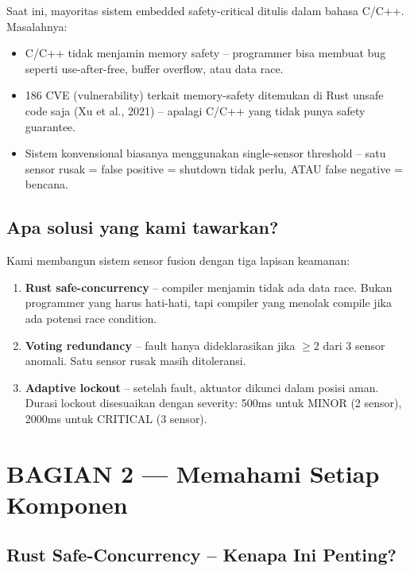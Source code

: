 \documentclass[12pt,a4paper]{article}
\begin{document}
Saat ini, mayoritas sistem embedded safety-critical ditulis dalam bahasa C/C++.
Masalahnya:
\begin{itemize}[nosep]
    \item C/C++ tidak menjamin memory safety -- programmer bisa membuat bug seperti
          use-after-free, buffer overflow, atau data race.
    \item 186 CVE (vulnerability) terkait memory-safety ditemukan di Rust unsafe code
          saja (Xu et al., 2021) -- apalagi C/C++ yang tidak punya safety guarantee.
    \item Sistem konvensional biasanya menggunakan single-sensor threshold -- satu sensor
          rusak = false positive = shutdown tidak perlu, ATAU false negative = bencana.
\end{itemize}

\subsection{Apa solusi yang kami tawarkan?}

Kami membangun sistem sensor fusion dengan tiga lapisan keamanan:
\begin{enumerate}[nosep]
    \item \textbf{Rust safe-concurrency} -- compiler menjamin tidak ada data race. Bukan
          programmer yang harus hati-hati, tapi compiler yang menolak compile jika
          ada potensi race condition.
    \item \textbf{Voting redundancy} -- fault hanya dideklarasikan jika $\ge 2$ dari 3 sensor
          anomali. Satu sensor rusak masih ditoleransi.
    \item \textbf{Adaptive lockout} -- setelah fault, aktuator dikunci dalam posisi aman.
          Durasi lockout disesuaikan dengan severity: 500ms untuk MINOR (2 sensor),
          2000ms untuk CRITICAL (3 sensor).
\end{enumerate}

\section{BAGIAN 2 --- Memahami Setiap Komponen}

\subsection{Rust Safe-Concurrency -- Kenapa Ini Penting?}
\end{document}
